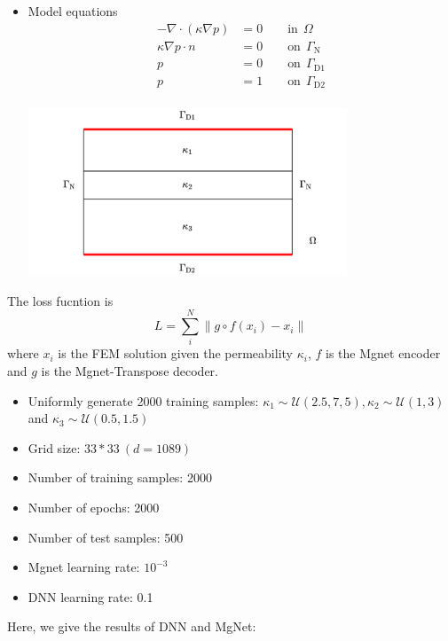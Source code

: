 \begin{itemize}
	\item Model equations
	\begin{align*}
	- \nabla \cdot (\kappa \nabla p) & = 0  \qquad \text{in}~~ \Omega \\
	\kappa \nabla p \cdot n &= 0 \qquad \text{on} ~~ \Gamma_\text{N} \\
	p  &= 0 \qquad \text{on} ~~\Gamma_{\text{D}1} \\
	p  &= 1 \qquad \text{on}~~ \Gamma_{\text{D}2} \\
	\end{align*}
	\begin{center}
		\vskip -20pt
		\includegraphics[height=5cm]{figures/Darcy_CNN/Darcy_domain.png}
	\end{center}
\end{itemize}
The loss fucntion is
$$
L = \sum_{i}^{N} \| g  \circ f(x_i) - x_i \|
$$
where $x_i$ is the FEM solution given the permeability $\kappa_i$, $f$ is the Mgnet encoder and $g$ is the Mgnet-Transpose decoder.

\begin{itemize}
	\item Uniformly generate 2000 training samples: $\kappa_1 \sim \mathcal{U}(2.5,7,5), \kappa_2 \sim \mathcal{U}(1,3)$ and $\kappa_3 \sim \mathcal{U}(0.5,1.5)$
	\item Grid size: $33*33 ~ (d=1089)$
	\item Number of training samples: 2000
	\item Number of epochs: 2000
	\item Number of test samples: 500
	\item Mgnet learning rate: $10^{-3}$
	\item DNN learning rate: 0.1
\end{itemize}
Here, we give the results of DNN and MgNet:

